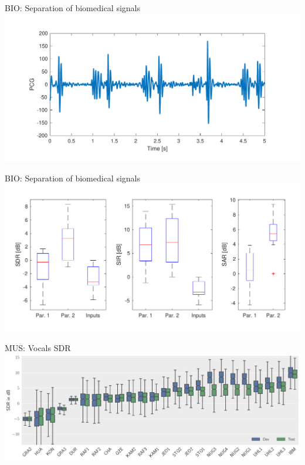 \documentclass{beamer}
\begin{document}
\begin{frame}{BIO: Separation of biomedical signals}
\includegraphics[width=\textwidth]{fig/BIO-PCG.pdf}
\end{frame}

\begin{frame}{BIO: Separation of biomedical signals}
\includegraphics[width=\textwidth]{fig/BIO-results.pdf}
\end{frame}

\begin{frame}{MUS: Vocals SDR}
\includegraphics[width=\textwidth]{fig/MUS_SDR.pdf}
\end{frame}
\end{document}
